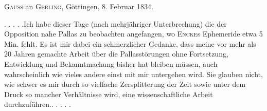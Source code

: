 \par{}\bigskip
\begin{center}
\textsc{Gauss} an \textsc{Gerling}, Göttingen, 8. Februar 1834.
\end{center}
\noindent\hspace*{\parindent}. . . . .\quad Ich habe dieser Tage (nach mehrjähriger Unterbrechung) die der Opposition nahe Pallas zu beobachten angefangen, wo \textsc{Encke}s Ephemeride etwa 5 Min. fehlt. Es ist mir dabei ein schmerzlicher Gedanke, dass meine vor mehr als 20 Jahren gemachte Arbeit über die Pallasstörungen ohne Fortsetzung, Entwicklung und Bekanntmachung bisher hat bleiben müssen, auch wahrscheinlich wie vieles andere einst mit mir untergehen wird. Sie glauben nicht, wie schwer es mir durch so vielfache Zersplitterung der Zeit sowie unter dem Druck so mancher Verhältnisse wird, eine wissenschaftliche Arbeit durchzuführen.\quad . . . . .
\par
